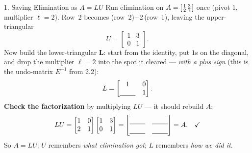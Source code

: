 \documentclass[10pt]{article}
\begin{document}
\begin{notesbox}{1. Saving Elimination as $A=LU$}
Run elimination on $A=\begin{bsmallmatrix} 1&3\\2&7 \end{bsmallmatrix}$ once (pivot $1$, multiplier
$\ell=2$). Row~2 becomes (row~2)$-2\,$(row~1), leaving the upper-triangular
\[
  U = \begin{bmatrix} 1 & 3 \\ 0 & 1 \end{bmatrix}.
\]
Now build the lower-triangular $\mathbf{L}$: start from the identity, put $1$s on the diagonal, and
drop the multiplier $\ell=2$ into the spot it cleared --- \emph{with a plus sign} (this is the
undo-matrix $E^{-1}$ from 2.2):
\[
  L = \begin{bmatrix} 1 & 0 \\ \blank{0.8cm} & 1 \end{bmatrix}.
\]
\textbf{Check the factorization} by multiplying $LU$ --- it should rebuild $A$:
\[
  LU = \begin{bmatrix} 1 & 0 \\ 2 & 1 \end{bmatrix}\begin{bmatrix} 1 & 3 \\ 0 & 1 \end{bmatrix}
  = \begin{bmatrix}\rule{0pt}{1.1em}\blank{0.8cm} & \blank{0.8cm}\\[2pt]\blank{0.8cm} & \blank{0.8cm}\end{bmatrix} = A. \quad\checkmark
\]
So $A=LU$: $U$ remembers \emph{what elimination got}; $L$ remembers \emph{how we did it}.
\end{notesbox}
\end{document}

